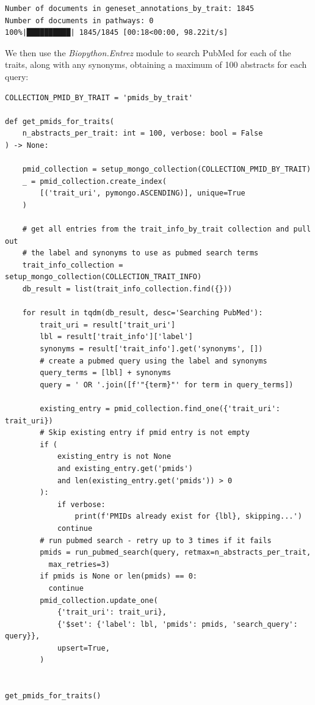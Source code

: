 \begin{lstlisting}[style=shell, numbers=none]
Number of documents in geneset_annotations_by_trait: 1845
Number of documents in pathways: 0
100%|██████████| 1845/1845 [00:18<00:00, 98.22it/s]
\end{lstlisting}

We then use the \textit{Biopython.Entrez} module to search PubMed for each of the traits, along with any synonyms, obtaining a maximum of 100 abstracts for each query:

\begin{lstlisting}[style=Python]
COLLECTION_PMID_BY_TRAIT = 'pmids_by_trait'

def get_pmids_for_traits(
    n_abstracts_per_trait: int = 100, verbose: bool = False
) -> None:

    pmid_collection = setup_mongo_collection(COLLECTION_PMID_BY_TRAIT)
    _ = pmid_collection.create_index(
        [('trait_uri', pymongo.ASCENDING)], unique=True
    )

    # get all entries from the trait_info_by_trait collection and pull out 
    # the label and synonyms to use as pubmed search terms
    trait_info_collection = setup_mongo_collection(COLLECTION_TRAIT_INFO)
    db_result = list(trait_info_collection.find({}))

    for result in tqdm(db_result, desc='Searching PubMed'):
        trait_uri = result['trait_uri']
        lbl = result['trait_info']['label']
        synonyms = result['trait_info'].get('synonyms', [])
        # create a pubmed query using the label and synonyms
        query_terms = [lbl] + synonyms
        query = ' OR '.join([f'"{term}"' for term in query_terms])

        existing_entry = pmid_collection.find_one({'trait_uri': trait_uri})
        # Skip existing entry if pmid entry is not empty
        if (
            existing_entry is not None
            and existing_entry.get('pmids')
            and len(existing_entry.get('pmids')) > 0
        ):
            if verbose:
                print(f'PMIDs already exist for {lbl}, skipping...')
            continue
        # run pubmed search - retry up to 3 times if it fails
        pmids = run_pubmed_search(query, retmax=n_abstracts_per_trait,
          max_retries=3)
        if pmids is None or len(pmids) == 0:
          continue
        pmid_collection.update_one(
            {'trait_uri': trait_uri},
            {'$set': {'label': lbl, 'pmids': pmids, 'search_query': query}},
            upsert=True,
        )


get_pmids_for_traits()
\end{lstlisting}

